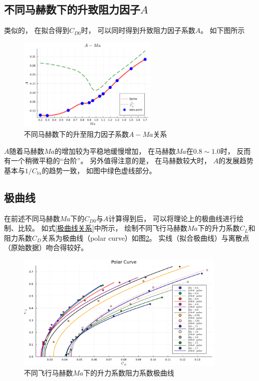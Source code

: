 \subsection{不同马赫数下的升致阻力因子$A$}

类似的，
在拟合得到$C_{D0}$时，
可以同时得到升致阻力因子系数$A$。
如下图所示

\begin{figure}[H]
    \centering
    \includegraphics[width=0.6\textwidth]{image/ch3/A_Ma.pdf}
    \caption{不同马赫数下的升至阻力因子系数$A-Ma$关系}
    \label{不同马赫数下的升至阻力因子系数关系}
\end{figure}

$A$随着马赫数$Ma$的增加较为平稳地缓慢增加，
在马赫数$Ma$在$0.8\sim 1.0$时，
反而有一个稍微平稳的“台阶”。
另外值得注意的是，
在马赫数较大时，
$A$的发展趋势基本与$1/C_{l\alpha}$的趋势一致，
如图中绿色虚线部分。




\subsection{极曲线}

在前述不同马赫数$Ma$下的$C_{D0}$与$A$计算得到后，
可以将理论上的极曲线进行绘制、比较。
如式\ref{极曲线关系}中所示，
绘制不同飞行马赫数$Ma$下的升力系数$C_L$和阻力系数$C_D$关系为极曲线（polar curve）如图\ref{不同飞行马赫数Ma下的升力系数阻力系数极曲线}。
实线（拟合极曲线）与离散点（原始数据）吻合得较好。

\begin{figure}[H]
    \centering
    \includegraphics[width=0.9\textwidth]{image/ch3/drag_polar.pdf}
    \caption{不同飞行马赫数$Ma$下的升力系数阻力系数极曲线}
    \label{不同飞行马赫数Ma下的升力系数阻力系数极曲线}
\end{figure}